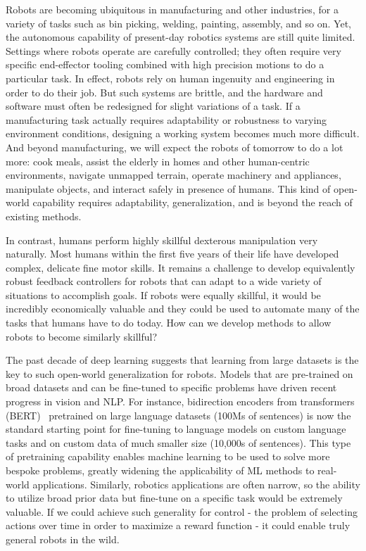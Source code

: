 Robots are becoming ubiquitous in manufacturing and other industries, for a variety of tasks such as bin picking, welding, painting, assembly, and so on.
Yet, the autonomous capability of present-day robotics systems are still quite limited.
Settings where robots operate are carefully controlled; they often require very specific end-effector tooling combined with high precision motions to do a particular task.
In effect, robots rely on human ingenuity and engineering in order to do their job.
But such systems are brittle, and the hardware and software must often be redesigned for slight variations of a task.
If a manufacturing task actually requires adaptability or robustness to varying environment conditions, designing a working system becomes much more difficult.
And beyond manufacturing, we will expect the robots of tomorrow to do a lot more: cook meals, assist the elderly in homes and other human-centric environments, navigate unmapped terrain, operate machinery and appliances, manipulate objects, and interact safely in presence of humans. 
This kind of open-world capability requires adaptability, generalization, and is beyond the reach of existing methods.

In contrast, humans perform highly skillful dexterous manipulation very naturally.
Most humans within the first five years of their life have developed complex, delicate fine motor skills.
It remains a challenge to develop equivalently robust feedback controllers for robots that can adapt to a wide variety of situations to accomplish goals.
If robots were equally skillful, it would be incredibly economically valuable and they could be used to automate many of the tasks that humans have to do today. How can we develop methods to allow robots to become similarly skillful?


The past decade of deep learning suggests that learning from large datasets is the key to such open-world generalization for robots.
Models that are pre-trained on broad datasets and can be fine-tuned to specific problems have driven recent progress in vision and NLP.
For instance, bidirection encoders from transformers (BERT)~\cite{devlin2019bert} pretrained on large language datasets (100Ms of sentences) is now the standard starting point for fine-tuning to language models on custom language tasks and on custom data of much smaller size (10,000s of sentences).
This type of pretraining capability enables machine learning to be used to solve more bespoke problems, greatly widening the applicability of ML methods to real-world applications.
Similarly, robotics applications are often narrow, so the ability to utilize broad prior data but fine-tune on a specific task would be extremely valuable.
If we could achieve such generality for control - the problem of selecting actions over time in order to maximize a reward function - it could enable truly general robots in the wild.

